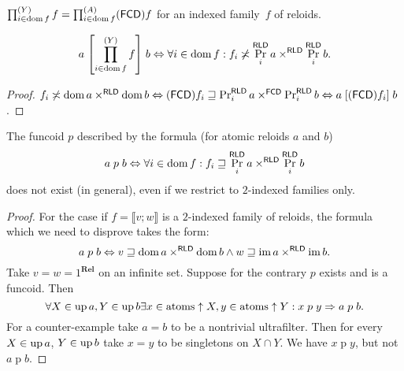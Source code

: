 
\begin{defn}
  $\prod^{(Y)}_{i \in \operatorname{dom} f} f = \prod^{(A)}_{i \in \operatorname{dom} f}
  (\mathsf{FCD}) f$ for an indexed family~$f$ of reloids.
\end{defn}

\begin{prop}
  \[ a \mathrel{\left[ \prod^{(Y)}_{i \in \operatorname{dom} f} f \right]} b
  \Leftrightarrow \forall i \in \operatorname{dom} f : f_i \not\asymp
  \Pr^{\mathsf{RLD}}_i a \times^{\mathsf{RLD}}
  \Pr^{\mathsf{RLD}}_i b. \]
\end{prop}

\begin{proof}
  $f_i \not\asymp \operatorname{dom} a \times^{\mathsf{RLD}} \operatorname{dom} b
  \Leftrightarrow (\mathsf{FCD}) f_i \sqsupseteq
  \Pr^{\mathsf{RLD}}_i a \times^{\mathsf{FCD}}
  \Pr^{\mathsf{RLD}}_i b \Leftrightarrow a
  \mathrel{[(\mathsf{FCD}) f_i]} b$.
\end{proof}

\begin{example}
  The funcoid $p$ described by the formula (for atomic reloids $a$ and $b$)
  \[ a \mathrel{\mathrel{p}} b \Leftrightarrow \forall i \in \operatorname{dom} f : f_i
     \sqsupseteq \Pr^{\mathsf{RLD}}_i a \times^{\mathsf{RLD}}
     \Pr^{\mathsf{RLD}}_i b \]
  does not exist (in general), even if we restrict to $2$-indexed families
  only.
\end{example}

\begin{proof}
  For the case if $f = \llbracket v ; w \rrbracket$ is a $2$-indexed family of
  reloids, the formula which we need to disprove takes the form:
  \[ a \mathrel{\mathrel{p}} b \Leftrightarrow v \sqsupseteq \operatorname{dom} a
     \times^{\mathsf{RLD}} \operatorname{dom} b \wedge w \sqsupseteq \operatorname{im}
     a \times^{\mathsf{RLD}} \operatorname{im} b. \]
  Take $v = w = 1^{\mathbf{Rel}}$ on an infinite set. Suppose for the
  contrary $p$ exists and is a funcoid. Then
  \[ \forall X \in \operatorname{up} a, Y \in \operatorname{up} b \exists x \in \operatorname{atoms}
     \uparrow X, y \in \operatorname{atoms} \uparrow Y : x \mathrel{\mathrel{p}} y \Rightarrow
     a \mathrel{\mathrel{p}} b. \]
  For a counter-example take $a = b$ to be a nontrivial ultrafilter. Then for
  every $X \in \operatorname{up} a$, $Y \in \operatorname{up} b$ take $x = y$ to be singletons
  on $X \cap Y$. We have $x \mathrel{\mathrel{p}} y$, but not $a \mathrel{\mathrel{p}} b$.
\end{proof}